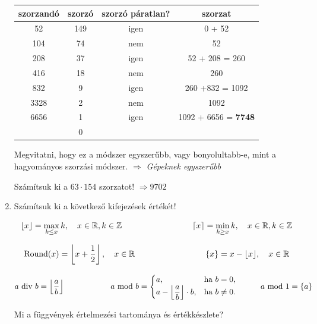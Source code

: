 \documentclass[a4paper]{article}
\newenvironment{solution}
{\color{RoyalBlue}}{\bigskip}
\newenvironment{comment}
{\color{Green}}{\bigskip}
\begin{document}
\begin{enumerate}
\begin{solution}
\begin{tabular}{|c|c|c|c|}
szorzandó & szorzó & szorzó páratlan? & szorzat \\
\hline
52 & 149 & igen & 0 + 52 \\
104 & 74 & nem & 52 \\
208 & 37 & igen & 52 + 208 = 260 \\
416 & 18 & nem & 260 \\
832 & 9 & igen & 260 +832 = 1092 \\
3328 & 2 & nem & 1092 \\
6656 & 1 & igen & 1092 + 6656 = \textbf{7748} \\
\hline
& 0 & & \\
\end{tabular}
\end{solution}

\begin{comment}
Megvitatni, hogy ez a módszer egyszerűbb, vagy bonyolultabb-e, mint a hagyományos szorzási módszer. $\Rightarrow$ \textit{Gépeknek egyszerűbb}
\end{comment}

Számítsuk ki a $63 \cdot 154$ szorzatot! $\Rightarrow 9702$

\item

Számítsuk ki a következő kifejezések értékét!

\begin{comment}
$$
\lfloor x \rfloor = \max_{k \leq x} k, \quad x \in \mathbb{R}, k \in \mathbb{Z}
\hskip 3cm
\lceil x \rceil = \min_{k \geq x} k, \quad x \in \mathbb{R}, k \in \mathbb{Z}
$$

$$
\text{Round}(x) = \left\lfloor x + \dfrac{1}{2} \right\rfloor,
\quad x \in \mathbb{R}
\hskip 3cm
\{x\} = x - \lfloor x \rfloor, \quad x \in \mathbb{R}
$$

$$
a \text{ div } b = \left\lfloor \dfrac{a}{b} \right\rfloor
\hskip 2cm
a \text{ mod } b = \begin{cases}
a, & \text{ha } b = 0, \\
a - \left\lfloor \dfrac{a}{b} \right\rfloor \cdot b, & \text{ha } b \neq 0. \\
\end{cases}
\hskip 1cm
a \text{ mod } 1 = \{a\}
$$
\end{comment}

Mi a függvények értelmezési tartománya és értékkészlete?


\end{enumerate}
\end{document}
